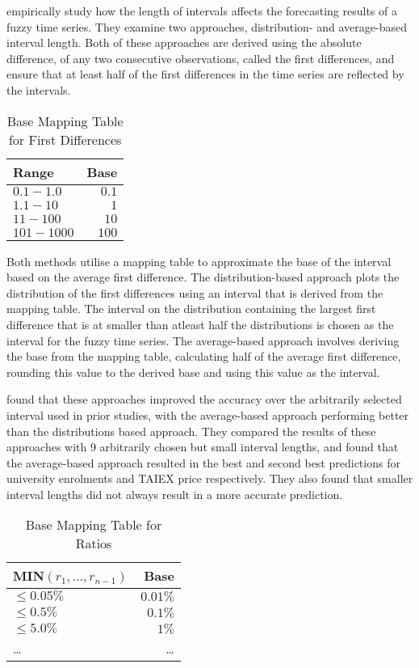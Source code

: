 \documentclass{article}
\theoremstyle{definition}
\begin{document}
\cite{Huarng2001effective} empirically study how the length of intervals affects the forecasting results of a fuzzy time series. They examine two approaches, distribution- and average-based interval length. Both of these approaches are derived using the absolute difference, of any two consecutive observations, called the first differences, and ensure that at least half of the first differences in the time series are reflected by the intervals. 

\begin{table}[H]
	\center
	\begin{tabularx}{0.5\textwidth}{ X R }
  	Range & Base \\
  	\hline 
  	\noalign{\smallskip}
  	$0.1-1.0$ & $0.1$ \\
  	$1.1-10$ & $1$ \\
  	$11-100$ & $10$ \\
  	$101-1000$ & $100$ \\
	\end{tabularx}
	\caption{Base Mapping Table for First Differences}
\end{table}

Both methods utilise a mapping table to approximate the base of the interval based on the average first difference. The distribution-based approach plots the distribution of the first differences using an interval that is derived from the mapping table. The interval on the distribution containing the largest first difference that is at smaller than atleast half the distributions is chosen as the interval for the fuzzy time series. The average-based approach involves deriving the base from the mapping table, calculating half of the average first difference, rounding this value to the derived base and using this value as the interval.

\citep{Huarng2001effective} found that these approaches improved the accuracy over the arbitrarily selected interval used in prior studies, with the average-based approach performing better than the distributions based approach. They compared the results of these approaches with 9 arbitrarily chosen but small interval lengths, and found that the average-based approach resulted in the best and second best predictions for university enrolments and TAIEX price respectively. They also found that smaller interval lengths did not always result in a more accurate prediction.

\begin{table}[H]
	\center
	\begin{tabularx}{0.5\textwidth}{ X R }
  	MIN$(r_1,\ldots,r_{n-1})$ & Base\\
  	\hline 
  	\noalign{\smallskip}
	$\leq 0.05\%$ & $0.01\%$ \\
	$\leq 0.5\%$ & $0.1\%$ \\
	$\leq 5.0\%$ & $1\%$ \\
	\ldots & \ldots
	\end{tabularx}
	\caption{Base Mapping Table for Ratios}
\end{table}
\end{document}
